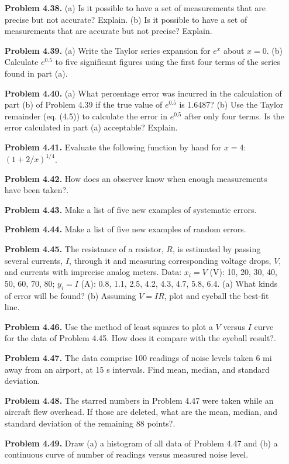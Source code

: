 \begin{enumerate}
    \item[\textbf{Problem 4.38.}] (a) Is it possible to have a set of measurements that are precise but not accurate? Explain. (b) Is it possible to have a set of measurements that are accurate but not precise? Explain.
    \item[\textbf{Problem 4.39.}] (a) Write the Taylor series expansion for $e^x$ about $x = 0$. (b) Calculate $e^{0.5}$ to five significant figures using the first four terms of the series found in part (a).
    \item[\textbf{Problem 4.40.}] (a) What percentage error was incurred in the calculation of part (b) of Problem 4.39 if the true value of $e^{0.5}$ is 1.6487? (b) Use the Taylor remainder (eq. (4.5)) to calculate the error in $e^{0.5}$ after only four terms. Is the error calculated in part (a) acceptable? Explain.
    \item[\textbf{Problem 4.41.}] Evaluate the following function by hand for $x = 4$: $(1 + 2/x)^{1/4}$.
    \item[\textbf{Problem 4.42.}] How does an observer know when enough measurements have been taken?.
    \item[\textbf{Problem 4.43.}] Make a list of five new examples of systematic errors.
    \item[\textbf{Problem 4.44.}] Make a list of five new examples of random errors.
    \item[\textbf{Problem 4.45.}] The resistance of a resistor, $R$, is estimated by passing several currents, $I$, through it and measuring corresponding voltage drops, $V$, and currents with imprecise analog meters. Data: $x_i = V$ (V): 10, 20, 30, 40, 50, 60, 70, 80; $y_i = I$ (A): 0.8, 1.1, 2.5, 4.2, 4.3, 4.7, 5.8, 6.4. (a) What kinds of error will be found? (b) Assuming $V = IR$, plot and eyeball the best-fit line.
    \item[\textbf{Problem 4.46.}] Use the method of least squares to plot a $V$ versus $I$ curve for the data of Problem 4.45. How does it compare with the eyeball result?.
    \item[\textbf{Problem 4.47.}] The data comprise 100 readings of noise levels taken 6 mi away from an airport, at 15 s intervals. Find mean, median, and standard deviation.
    \item[\textbf{Problem 4.48.}] The starred numbers in Problem 4.47 were taken while an aircraft flew overhead. If those are deleted, what are the mean, median, and standard deviation of the remaining 88 points?.
    \item[\textbf{Problem 4.49.}] Draw (a) a histogram of all data of Problem 4.47 and (b) a continuous curve of number of readings versus measured noise level.

\end{enumerate}
